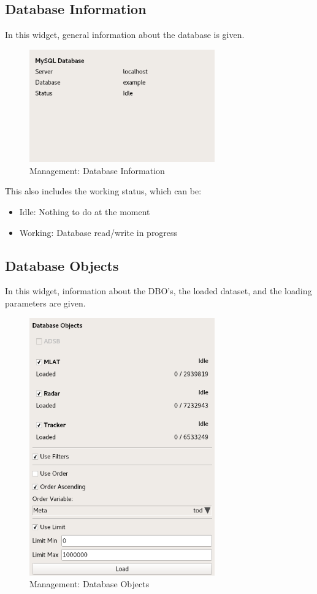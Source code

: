 \subsection{Database Information}

In this widget, general information about the database is given. 

\begin{figure}[H]
  \center
    \includegraphics[width=8cm,frame]{../screenshots/management_database.png}
  \caption{Management: Database Information}
  \label{fig:management_database}
\end{figure}

This also includes the working status, which can be:

\begin{itemize}
 \item Idle: Nothing to do at the moment
 \item Working: Database read/write in progress
\end{itemize}

\subsection{Database Objects}
\label{sec:management_dbos}

In this widget, information about the DBO's, the loaded dataset, and the loading parameters are given.

\begin{figure}[H]
  \center
    \includegraphics[width=8cm,frame]{../screenshots/management_dbos.png}
  \caption{Management: Database Objects}
  \label{fig:management_objects}
\end{figure}


